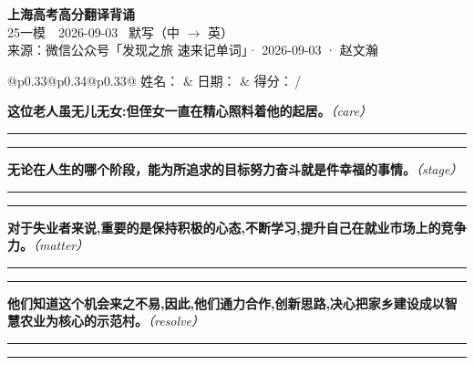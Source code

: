 \documentclass[11pt,a4paper]{article}
\newcommand{\num}[1]{\makebox[1.9em][r]{#1.}\hspace{0.3em}}
\newcommand{\wline}{\noindent\rule{\linewidth}{0.4pt}}
\newcommand{\prompt}[1]{\emph{\textcolor{tipblue}{\small（#1）}}}
\begin{document}
\pagestyle{plain}
\begin{center}
{\LARGE\bfseries 上海高考高分翻译背诵 }\\[0.25em]
{\large 25一模　2026-09-03 \quad\ 默写（中 $\to$ 英）}\\[0.35em]
{\footnotesize 来源：微信公众号「发现之旅 速来记单词」· 2026-09-03 · 赵文瀚}
\end{center}

\vspace{0.4em}
\noindent\begin{tabular}{@{}p{0.33\textwidth}@{}p{0.34\textwidth}@{}p{0.33\textwidth}@{}}
姓名：\underline{\hspace{2.0cm}} & 日期：\underline{\hspace{2.0cm}} & 得分：\underline{\hspace{1.4cm}}\,/ \\
\end{tabular}

\vspace{0.5em}

\vspace{0.8em}
\num{1}\textbf{这位老人虽无儿无女:但侄女一直在精心照料着他的起居。}\prompt{care}

\vspace{0.3em}

\wline\vspace{0.3em}
\wline

\num{2}\textbf{无论在人生的哪个阶段，能为所追求的目标努力奋斗就是件幸福的事情。}\prompt{stage}

\vspace{0.3em}

\wline\vspace{0.3em}
\wline

\num{3}\textbf{对于失业者来说,重要的是保持积极的心态,不断学习,提升自己在就业市场上的竞争力。}\prompt{matter}

\vspace{0.3em}

\wline\vspace{0.3em}
\wline

\num{4}\textbf{他们知道这个机会来之不易,因此,他们通力合作,创新思路,决心把家乡建设成以智慧农业为核心的示范村。}\prompt{resolve}

\vspace{0.3em}

\wline\vspace{0.3em}
\wline
\end{document}
